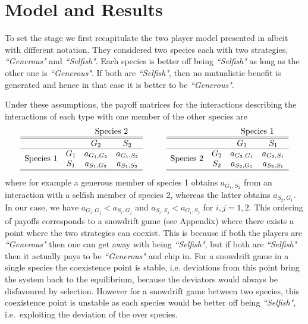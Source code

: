\documentclass[aps,pre,amsfonts,floatfix, onecolumn,showkeys]{revtex4-1}
\begin{document}
\section{Model and Results}

To set the stage we first recapitulate the two player model presented in \cite{bergstrom:PNAS:2003} albeit with different notation.
They considered two species each with two strategies, \textit{``Generous"} and \textit{``Selfish"}.
Each species is better off being \textit{``Selfish"} as long as the other one is \textit{``Generous"}.
If both are \textit{``Selfish"}, then no mutualistic benefit is generated and hence in that case it is better to be \textit{``Generous"}.

Under these assumptions, the payoff matrices for the interactions describing the interactions of each type with one member of the other species are
%
\begin{equation}\label{}
\begin{array}{cccc}
& & \multicolumn{2}{c}{\text{Species 2}}\\
\hline\hline
&	&	G_2		&	S_2	\\
\hline
 \multirow{2}{*}{Species 1} & G_1 	& a_{G_1,G_2} &	a_{G_1,S_2} \\
&	S_1	&  a_{S_1,G_2} & a_{S_1,S_2} \\
 \hline\hline
\end{array}
\hspace{1cm}
\begin{array}{cccc}
& & \multicolumn{2}{c}{\text{Species 1}}\\
\hline\hline
&	&	G_1		&	S_1	\\
\hline
 \multirow{2}{*}{Species 2} & G_2 	& a_{G_2,G_1} &	a_{G_2,S_1} \\
&	S_2	&  a_{S_2,G_1} & a_{S_2,S_1} \nonumber \\
 \hline\hline
\end{array}
\end{equation}
%
where for example a generous member of species 1 obtains $a_{G_1,S_2}$ from an interaction with a selfish member of species 2, whereas the latter obtains $a_{S_2,G_1}$.
In our case, we have $a_{G_i,G_j} < a_{S_i,G_j}$ and $a_{S_i,S_j} < a_{G_i,S_j}$
for $i,j=1,2$.
This ordering of payoffs corresponds to a snowdrift game \cite{doebeli:EL:2005} (see Appendix) where there exists a point where the two strategies can coexist.
This is because if both the players are \textit{``Generous"} then one can get away with being \textit{``Selfish"}, but if both are \textit{``Selfish"} then it actually pays to be \textit{``Generous"} and chip in.
For a snowdrift game in a single species the coexistence point is stable, i.e. deviations from this point bring the system back to the equilibrium, because the deviators would always be disfavoured by selection.
However for a snowdrift game between two species, this coexistence point is unstable as each species would be better off being \textit{``Selfish"}, i.e.\ exploiting the deviation of the over species.
\end{document}
